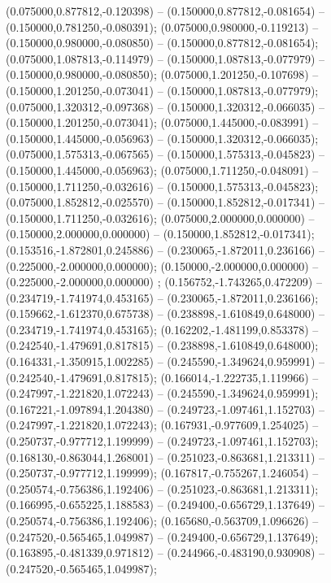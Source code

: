  (0.075000,0.877812,-0.120398) -- (0.150000,0.877812,-0.081654) -- (0.150000,0.781250,-0.080391);
 (0.075000,0.980000,-0.119213) -- (0.150000,0.980000,-0.080850) -- (0.150000,0.877812,-0.081654);
 (0.075000,1.087813,-0.114979) -- (0.150000,1.087813,-0.077979) -- (0.150000,0.980000,-0.080850);
 (0.075000,1.201250,-0.107698) -- (0.150000,1.201250,-0.073041) -- (0.150000,1.087813,-0.077979);
 (0.075000,1.320312,-0.097368) -- (0.150000,1.320312,-0.066035) -- (0.150000,1.201250,-0.073041);
 (0.075000,1.445000,-0.083991) -- (0.150000,1.445000,-0.056963) -- (0.150000,1.320312,-0.066035);
 (0.075000,1.575313,-0.067565) -- (0.150000,1.575313,-0.045823) -- (0.150000,1.445000,-0.056963);
 (0.075000,1.711250,-0.048091) -- (0.150000,1.711250,-0.032616) -- (0.150000,1.575313,-0.045823);
 (0.075000,1.852812,-0.025570) -- (0.150000,1.852812,-0.017341) -- (0.150000,1.711250,-0.032616);
 (0.075000,2.000000,0.000000) -- (0.150000,2.000000,0.000000) -- (0.150000,1.852812,-0.017341);
 (0.153516,-1.872801,0.245886) -- (0.230065,-1.872011,0.236166) -- (0.225000,-2.000000,0.000000);
 (0.150000,-2.000000,0.000000) -- (0.225000,-2.000000,0.000000) ;
 (0.156752,-1.743265,0.472209) -- (0.234719,-1.741974,0.453165) -- (0.230065,-1.872011,0.236166);
 (0.159662,-1.612370,0.675738) -- (0.238898,-1.610849,0.648000) -- (0.234719,-1.741974,0.453165);
 (0.162202,-1.481199,0.853378) -- (0.242540,-1.479691,0.817815) -- (0.238898,-1.610849,0.648000);
 (0.164331,-1.350915,1.002285) -- (0.245590,-1.349624,0.959991) -- (0.242540,-1.479691,0.817815);
 (0.166014,-1.222735,1.119966) -- (0.247997,-1.221820,1.072243) -- (0.245590,-1.349624,0.959991);
 (0.167221,-1.097894,1.204380) -- (0.249723,-1.097461,1.152703) -- (0.247997,-1.221820,1.072243);
 (0.167931,-0.977609,1.254025) -- (0.250737,-0.977712,1.199999) -- (0.249723,-1.097461,1.152703);
 (0.168130,-0.863044,1.268001) -- (0.251023,-0.863681,1.213311) -- (0.250737,-0.977712,1.199999);
 (0.167817,-0.755267,1.246054) -- (0.250574,-0.756386,1.192406) -- (0.251023,-0.863681,1.213311);
 (0.166995,-0.655225,1.188583) -- (0.249400,-0.656729,1.137649) -- (0.250574,-0.756386,1.192406);
 (0.165680,-0.563709,1.096626) -- (0.247520,-0.565465,1.049987) -- (0.249400,-0.656729,1.137649);
 (0.163895,-0.481339,0.971812) -- (0.244966,-0.483190,0.930908) -- (0.247520,-0.565465,1.049987);
